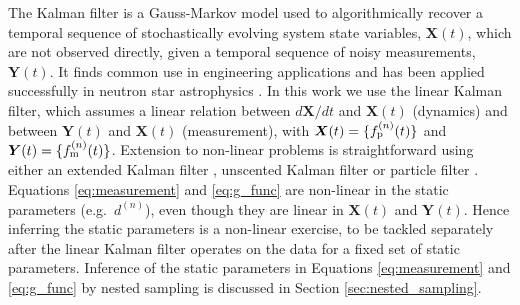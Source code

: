 \documentclass[fleqn,usenatbib,useAMS]{mnras}
\begin{document}
The Kalman filter \citep{Kalman1} is a Gauss-Markov model used to algorithmically recover a temporal sequence of stochastically evolving  system state variables, $\boldsymbol{X}(t)$, which are not observed directly, given a temporal sequence of noisy measurements, $\boldsymbol{Y}(t)$. It finds common use in engineering applications and has been applied successfully in neutron star astrophysics \citep[e.g.][]{Myers2021MNRAS.502.3113M,Meyers2021,Melatos2023}. In this work we use the linear Kalman filter, which assumes a linear relation between $d{\boldsymbol{X}}/dt$ and ${\boldsymbol{X}}(t)$ (dynamics) and between ${\boldsymbol{Y}}(t)$ and ${\boldsymbol{X}}(t)$ (measurement), with ${\boldsymbol{X}}(t) = \{ f_{\rm p}^{(n)}(t) \}$ and ${\boldsymbol{Y}}(t) = \{ f_{\rm m}^{(n)}(t) \}$. Extension to non-linear problems is straightforward using either an extended Kalman filter \citep{zarchan2000fundamentals}, unscented Kalman filter \citep{882463van} or particle filter \citep{Simon10}. Equations \eqref{eq:measurement} and \eqref{eq:g_func} are non-linear in the static parameters (e.g.\ $d^{(n)}$), even though they are linear in ${\boldsymbol{X}}(t)$ and ${\boldsymbol{Y}}(t)$. Hence inferring the static parameters is a non-linear exercise, to be tackled separately after the linear Kalman filter operates on the data for a fixed set of static parameters. Inference of the static parameters in Equations \eqref{eq:measurement} and \eqref{eq:g_func} by nested sampling is discussed in Section \ref{sec:nested_sampling}. \newline 
\end{document}
